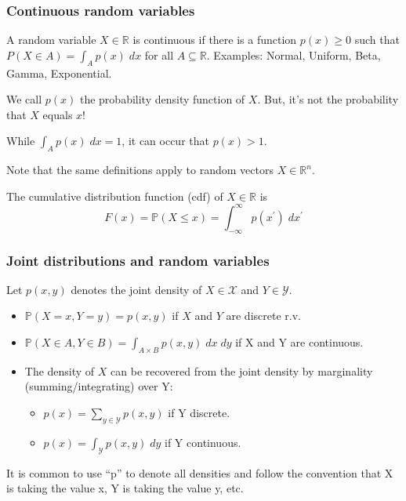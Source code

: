 \documentclass[mathserif]{beamer}
\begin{document}
\begin{frame}
\frametitle{Continuous random variables}

A random variable $X \in \mathbb{R}$ is continuous if there is a function
$p(x) \geq 0$ such that $P(X \in A) = \int_A p(x) \; dx$ for all $A \subseteq \mathbb{R}.$
\vspace*{0.5em}
Examples: Normal, Uniform, Beta, Gamma, Exponential. 

\vspace*{0.5em}

We call $p(x)$ the probability density function of $X.$ But, it's not the probability that $X$ equals $x$! 

\vspace*{0.5em}

While $\int_A p(x) \; dx = 1$, it can occur that $p(x) > 1.$

\vspace*{0.5em}

Note that the same definitions apply to random vectors $X \in \mathbb{R}^n.$

\vspace*{0.5em}

The cumulative distribution function (cdf) of $X \in \mathbb{R}$ is 
$$F(x) = \mathbb{P}(X \leq x) = \int_{-\infty}^{\infty} p(x^{\prime}) \; dx^\prime$$

\end{frame}

\begin{frame}
\frametitle{Joint distributions and random variables}


Let $p(x,y)$ denotes the joint density of $X \in \mathcal{X}$ and $Y \in \mathcal{Y}.$

\begin{itemize}
\item $\mathbb{P}(X = x, Y = y) = p(x,y)$ if $X$ and $Y$ are discrete r.v.
\item $\mathbb{P}(X \in A, Y \in B) = \int_{A \times B} p(x, y) \; dx \; dy$ if X and Y are continuous.
\item The density of $X$ can be recovered from the joint density by marginality (summing/integrating) over Y: 
\begin{itemize}
\item $p(x) = \sum_{y \in \mathcal{Y}} p(x,y)$ if Y discrete.
\item $p(x) = \int_{\mathcal{Y}} p(x,y) \; dy$ if Y continuous.
\end{itemize}
\end{itemize}

\vspace*{1em}
It is common to use “p” to denote all densities and
follow the convention that X is taking the value x, Y is
taking the value y, etc.

\end{frame}
\end{document}
